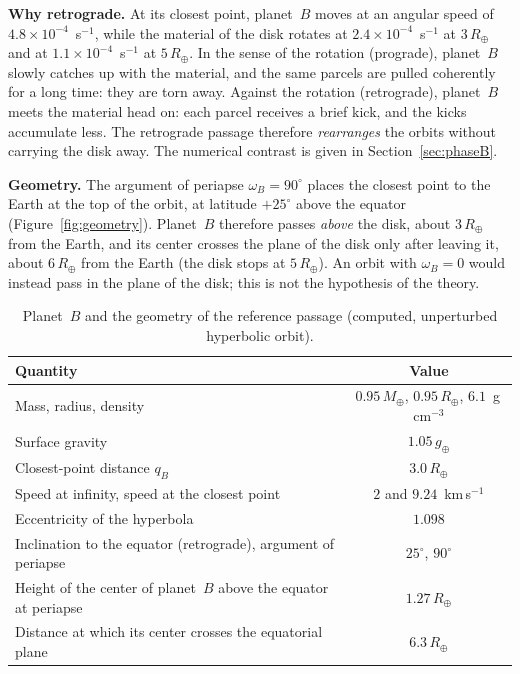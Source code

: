 \documentclass[11pt,a4paper]{article}
\newcommand{\Rt}{\ensuremath{R_\oplus}}
\newcommand{\Mt}{\ensuremath{M_\oplus}}
\newcommand{\qB}{\ensuremath{q_B}}
\begin{document}
\textbf{Why retrograde.} At its closest point, planet~$B$ moves at an angular speed of $4.8\times10^{-4}$~s$^{-1}$, while the material of the disk rotates at $2.4\times10^{-4}$~s$^{-1}$ at $3\,\Rt$ and at $1.1\times10^{-4}$~s$^{-1}$ at $5\,\Rt$. In the sense of the rotation (prograde), planet~$B$ slowly catches up with the material, and the same parcels are pulled coherently for a long time: they are torn away. Against the rotation (retrograde), planet~$B$ meets the material head on: each parcel receives a brief kick, and the kicks accumulate less. The retrograde passage therefore \emph{rearranges} the orbits without carrying the disk away. The numerical contrast is given in Section~\ref{sec:phaseB}.

\textbf{Geometry.} The argument of periapse $\omega_B=90^\circ$ places the closest point to the Earth at the top of the orbit, at latitude $+25^\circ$ above the equator (Figure~\ref{fig:geometry}). Planet~$B$ therefore passes \emph{above} the disk, about $3\,\Rt$ from the Earth, and its center crosses the plane of the disk only after leaving it, about $6\,\Rt$ from the Earth (the disk stops at $5\,\Rt$). An orbit with $\omega_B=0$ would instead pass in the plane of the disk; this is not the hypothesis of the theory.

\begin{table}[htbp]
\centering
\caption{Planet~$B$ and the geometry of the reference passage (computed, unperturbed hyperbolic orbit).\label{tab:B}}
\small
\begin{tabular}{lc}
\toprule
Quantity & Value \\
\midrule
Mass, radius, density & $0.95\,\Mt$, $0.95\,\Rt$, $6.1$~g\,cm$^{-3}$ \\
Surface gravity & $1.05\,g_\oplus$ \\
Closest-point distance $\qB$ & $3.0\,\Rt$ \\
Speed at infinity, speed at the closest point & $2$ and $9.24$~km\,s$^{-1}$ \\
Eccentricity of the hyperbola & $1.098$ \\
Inclination to the equator (retrograde), argument of periapse & $25^\circ$, $90^\circ$ \\
Height of the center of planet~$B$ above the equator at periapse & $1.27\,\Rt$ \\
Distance at which its center crosses the equatorial plane & $6.3\,\Rt$ \\
\bottomrule
\end{tabular}
\end{table}
\end{document}
